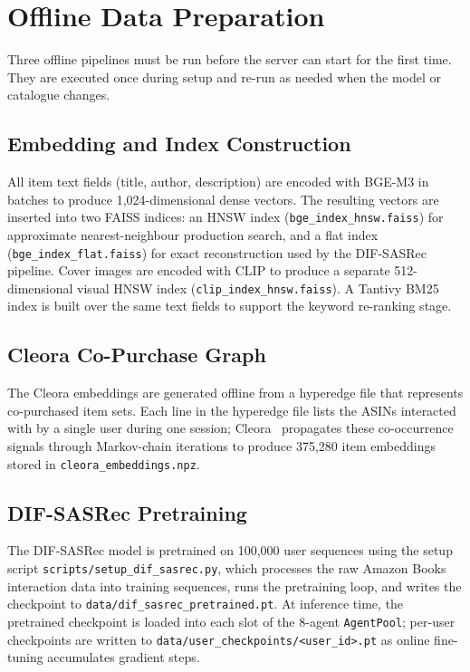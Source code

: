 \section{Offline Data Preparation}
\label{sec:app_preparation}

Three offline pipelines must be run before the server can start for the first time.
They are executed once during setup and re-run as needed when the model or catalogue changes.

\subsection{Embedding and Index Construction}

All item text fields (title, author, description) are encoded with BGE-M3 in batches to produce 1{,}024-dimensional dense vectors.
The resulting vectors are inserted into two FAISS indices: an HNSW index (\nolinkurl{bge_index_hnsw.faiss}) for approximate nearest-neighbour production search, and a flat index (\nolinkurl{bge_index_flat.faiss}) for exact reconstruction used by the DIF-SASRec pipeline.
Cover images are encoded with CLIP to produce a separate 512-dimensional visual HNSW index (\nolinkurl{clip_index_hnsw.faiss}).
A Tantivy BM25 index is built over the same text fields to support the keyword re-ranking stage.

\subsection{Cleora Co-Purchase Graph}

The Cleora embeddings are generated offline from a hyperedge file that represents co-purchased item sets.
Each line in the hyperedge file lists the ASINs interacted with by a single user during one session; Cleora~\cite{rychalska2021cleora} propagates these co-occurrence signals through Markov-chain iterations to produce 375{,}280 item embeddings stored in \nolinkurl{cleora_embeddings.npz}.

\subsection{DIF-SASRec Pretraining}

The DIF-SASRec model is pretrained on 100{,}000 user sequences using the setup script \nolinkurl{scripts/setup_dif_sasrec.py}, which processes the raw Amazon Books interaction data into training sequences, runs the pretraining loop, and writes the checkpoint to \nolinkurl{data/dif_sasrec_pretrained.pt}.
At inference time, the pretrained checkpoint is loaded into each slot of the 8-agent \texttt{AgentPool}; per-user checkpoints are written to \nolinkurl{data/user_checkpoints/<user_id>.pt} as online fine-tuning accumulates gradient steps.

